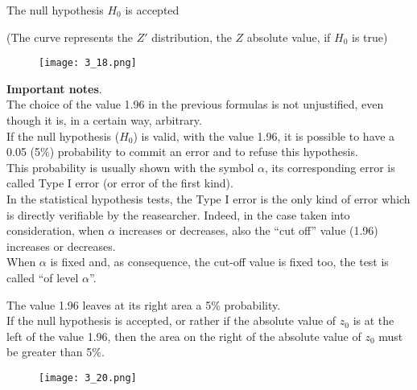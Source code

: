 \begin{frame}
  \vspace*{.25cm}
  \centering
  The null hypothesis  $ H_0 $ is accepted\\
  \begin{tiny} (The curve represents the $ Z' $ distribution, the $ Z $ absolute value, if $ H_0 $ is true) \end{tiny}
  \begin{figure}
    \texttt{[image: 3\_18.png]}
  \end{figure}
\end{frame}

\begin{frame}
  \begin{small}
    \vspace*{.25cm}
    \textbf{Important notes}.\\
    \vspace*{.25cm}
    The choice of the value 1.96 in the previous formulas is not unjustified, even though it is, in a certain way, arbitrary.\\
    \vspace*{.1cm}
    If the null hypothesis ($ H_0 $) is valid, with the value 1.96, it is possible to have a 0.05 (5$ \% $) probability to commit an error and to refuse this hypothesis.\\
    \vspace*{.2cm}
    This probability is usually shown with the symbol $\alpha$, its corresponding error is called Type I error (or error of the first kind).\\
    \vspace*{.2cm}
    In the statistical hypothesis tests, the Type I error is the only kind of error which is directly verifiable by the reasearcher. Indeed, in the case taken into consideration, when $ \alpha $ increases or decreases, also the ``cut off'' value (1.96) increases or decreases.\\
   \vspace*{.2cm}
   When $ \alpha $ is fixed and, as consequence, the cut-off value is fixed too, the test is called ``of level $\alpha$''.
  \end{small}
\end{frame}

\begin{frame}
  The value 1.96 leaves at its right area a 5$ \% $ probability.\\
  \vspace*{.25cm}
  If the null hypothesis is accepted, or rather if the absolute value of $ z_0 $ is at the left of the value 1.96, then the area on the right of the absolute value of $ z_0 $ must be greater than 5$ \% $.\\
  \begin{figure}
    \texttt{[image: 3\_20.png]}
  \end{figure}
\end{frame}

